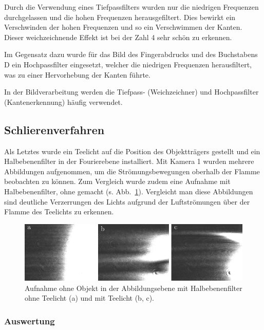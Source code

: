 Durch die Verwendung eines Tiefpassfilters wurden nur die niedrigen Frequenzen durchgelassen und die hohen Frequenzen herausgefiltert. Dies bewirkt ein Verschwinden der hohen Frequenzen und so ein Verschwimmen der Kanten. Dieser weichzeichnende Effekt ist bei der Zahl 4 sehr schön zu erkennen.

Im Gegensatz dazu wurde für das Bild des Fingerabdrucks und des Buchstabens D ein Hochpassfilter eingesetzt, welcher die niedrigen Frequenzen herausfiltert, was zu einer Hervorhebung der Kanten führte.

In der Bildverarbeitung werden die Tiefpass- (Weichzeichner) und Hochpassfilter (Kantenerkennung) häufig verwendet.


\subsection{Schlierenverfahren}
Als Letztes wurde ein Teelicht auf die Position des Objektträgers gestellt und ein Halbebenenfilter in der Fourierebene installiert. Mit Kamera 1 wurden mehrere Abbildungen aufgenommen, um die Strömungsbewegungen oberhalb der Flamme beobachten zu können. Zum Vergleich wurde zudem eine Aufnahme mit Halbebenenfilter, ohne gemacht (s. Abb.~\ref{fig:Halbebenenfilter_mit_und_ohne_Teelicht}). Vergleicht man diese Abbildungen sind deutliche Verzerrungen des Lichts aufgrund der Luftströmungen über der Flamme des Teelichts zu erkennen. 

\begin{figure}[h]
	\centering
	\includegraphics{images/ergebniss_Teelicht/abb.pdf}
	\caption[Schlieren]{
		Aufnahme ohne Objekt in der Abbildungsebene mit Halbebenenfilter ohne Teelicht (a) und mit Teelicht (b, c).
	}
	\label{fig:Halbebenenfilter_mit_und_ohne_Teelicht}
\end{figure}


\subsubsection*{Auswertung}
% 

